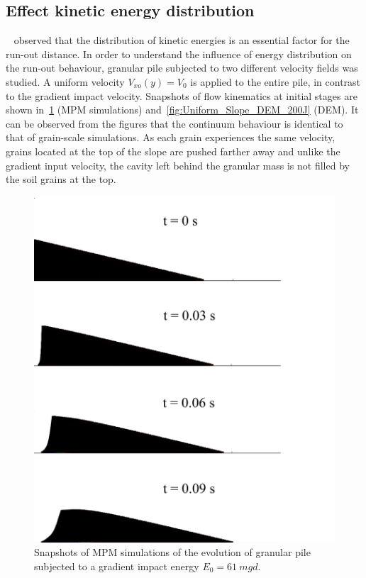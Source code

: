 \subsection*{Effect kinetic energy distribution}

~\citet{Staron2005} observed that the distribution of kinetic energies is an 
essential factor for the run-out distance. In order to understand the influence 
of energy distribution on the run-out behaviour, granular pile subjected to two 
different velocity fields was studied. A uniform velocity $V_{xo} (y) = V_0$ is 
applied to the entire pile, in contrast to the gradient impact velocity. 
Snapshots of flow kinematics at initial stages are shown 
in~\cref{fig:Uniform_Slope_Profile_200J} (MPM simulations) 
and~\cref{fig:Uniform_Slope_DEM_200J} (DEM). It can be observed from the 
figures that the continuum behaviour is identical to that of grain-scale 
simulations. As each grain experiences the same velocity, grains located at the 
top of the slope are pushed farther away and unlike the gradient input 
velocity, the cavity left behind the granular mass is not filled by the soil 
grains at the top. 
\begin{figure}[tbph]
\centering
\includegraphics[width=\textwidth]{Uniform_Slope_Profile_200J}
\caption{Snapshots of MPM simulations of the evolution of granular pile 
subjected to a gradient impact energy $E_0 = 61 \ mgd$.}
\label{fig:Uniform_Slope_Profile_200J}
\end{figure}

